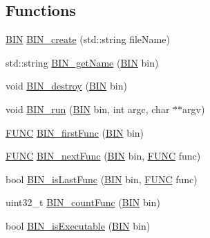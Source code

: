 \subsection*{\-Functions}
\begin{DoxyCompactItemize}
\item 
\hyperlink{namespace_e_p_a_x_ad71db9d891528e4a8b303787dff8ac0b}{\-B\-I\-N} \hyperlink{namespace_e_p_a_x_a68500dbda3daf6e66dc6bf0067ec34b7}{\-B\-I\-N\-\_\-create} (std\-::string file\-Name)
\item 
std\-::string \hyperlink{namespace_e_p_a_x_af6914ca60796cbbf43e9996bed07763d}{\-B\-I\-N\-\_\-get\-Name} (\hyperlink{namespace_e_p_a_x_ad71db9d891528e4a8b303787dff8ac0b}{\-B\-I\-N} bin)
\item 
void \hyperlink{namespace_e_p_a_x_a8df16d3fb7f820014a3d6105514420a5}{\-B\-I\-N\-\_\-destroy} (\hyperlink{namespace_e_p_a_x_ad71db9d891528e4a8b303787dff8ac0b}{\-B\-I\-N} bin)
\item 
void \hyperlink{namespace_e_p_a_x_a3d3f6035b509ee30f07ab3fecdd374e8}{\-B\-I\-N\-\_\-run} (\hyperlink{namespace_e_p_a_x_ad71db9d891528e4a8b303787dff8ac0b}{\-B\-I\-N} bin, int argc, char $\ast$$\ast$argv)
\item 
\hyperlink{namespace_e_p_a_x_a5b05cc89d633ec2241cb3af828c03024}{\-F\-U\-N\-C} \hyperlink{namespace_e_p_a_x_a40aa644870b9dea8ae37b804724534fb}{\-B\-I\-N\-\_\-first\-Func} (\hyperlink{namespace_e_p_a_x_ad71db9d891528e4a8b303787dff8ac0b}{\-B\-I\-N} bin)
\item 
\hyperlink{namespace_e_p_a_x_a5b05cc89d633ec2241cb3af828c03024}{\-F\-U\-N\-C} \hyperlink{namespace_e_p_a_x_aa71e749763e7bb1f923858e3141349e1}{\-B\-I\-N\-\_\-next\-Func} (\hyperlink{namespace_e_p_a_x_ad71db9d891528e4a8b303787dff8ac0b}{\-B\-I\-N} bin, \hyperlink{namespace_e_p_a_x_a5b05cc89d633ec2241cb3af828c03024}{\-F\-U\-N\-C} func)
\item 
bool \hyperlink{namespace_e_p_a_x_ab584e84ccd83e8c3a381df43cf935087}{\-B\-I\-N\-\_\-is\-Last\-Func} (\hyperlink{namespace_e_p_a_x_ad71db9d891528e4a8b303787dff8ac0b}{\-B\-I\-N} bin, \hyperlink{namespace_e_p_a_x_a5b05cc89d633ec2241cb3af828c03024}{\-F\-U\-N\-C} func)
\item 
uint32\-\_\-t \hyperlink{namespace_e_p_a_x_a34c62237f68d75bc1741dd752f769bd7}{\-B\-I\-N\-\_\-count\-Func} (\hyperlink{namespace_e_p_a_x_ad71db9d891528e4a8b303787dff8ac0b}{\-B\-I\-N} bin)
\item 
bool \hyperlink{namespace_e_p_a_x_aa3b4c872835797815fc1a3c4414a042b}{\-B\-I\-N\-\_\-is\-Executable} (\hyperlink{namespace_e_p_a_x_ad71db9d891528e4a8b303787dff8ac0b}{\-B\-I\-N} bin)
$$
\end{DoxyCompactItemize}

